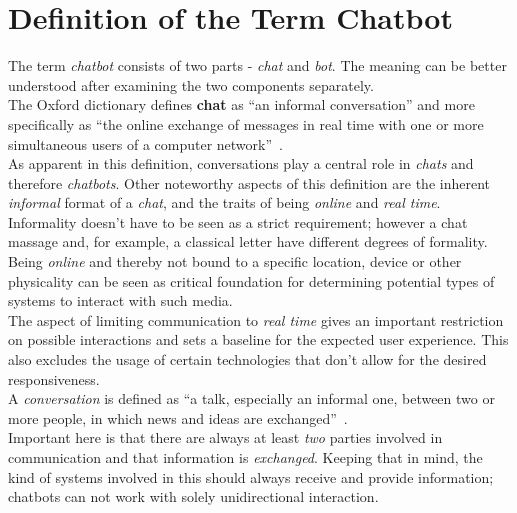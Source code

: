 \section{Definition of the Term Chatbot}
\label{defchatbot}


The term \emph{chatbot} consists of two parts - \emph{chat} and \emph{bot}.
The meaning can be better understood after examining the two components separately.
\\

The Oxford dictionary defines \textbf{chat} as ``an informal conversation'' and more specifically as ``the online exchange of messages in real time with one or more simultaneous users of a computer network''~\cite{oxfordchat}.
\\
As apparent in this definition, conversations play a central role in \emph{chats} and therefore \emph{chatbots}.
Other noteworthy aspects of this definition are the inherent \emph{informal} format of a \emph{chat},
and the traits of being \emph{online} and \emph{real time}.
\\

Informality doesn't have to be seen as a strict requirement; however a chat massage and, for example, a classical letter have different degrees of formality.
\\

Being \emph{online} and thereby not bound to a specific location, device or other physicality can be seen as critical foundation for determining potential types of systems to interact with such media.
\\

The aspect of limiting communication to \emph{real time} gives an important restriction on possible interactions and sets a baseline for the expected user experience.
This also excludes the usage of certain technologies that don't allow for the desired responsiveness.
\\

A \emph{conversation} is defined as ``a talk, especially an informal one, between two or more people, in which news and ideas are exchanged''~\cite{oxfordconversation}.
\\
Important here is that there are always at least \emph{two} parties involved in communication and that information is \emph{exchanged}.
Keeping that in mind, the kind of systems involved in this should always receive and provide information;
chatbots can not work with solely unidirectional interaction.
\\

